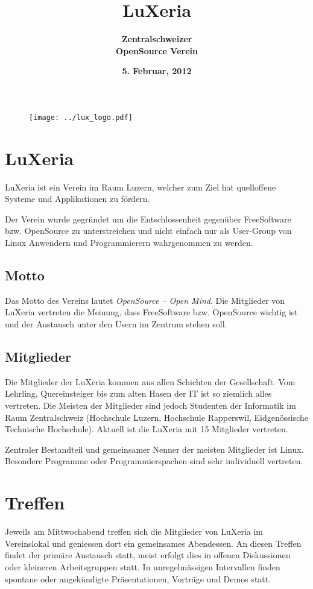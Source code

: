 \documentclass[10pt,foldmark,notumble]{leaflet}
\title{\bf LuXeria}
\author{%
\Large \bf Zentralschweizer\\\bf OpenSource Verein
}
\date{\bf 5. Februar, 2012 }
\begin{document}
\clearpage
\thispagestyle{empty}
\maketitle

\vfill
\begin{figure}
\centering
\texttt{[image: ../lux\_logo.pdf]}
\end{figure}


\newpage
\section{LuXeria}
LuXeria ist ein Verein im Raum Luzern, welcher zum Ziel hat 
quelloffene Systeme und Applikationen zu fördern.


Der Verein wurde gegründet um die Entschlossenheit gegenüber
FreeSoftware bzw. OpenSource zu unterstreichen und nicht einfach 
nur als User-Group von Linux Anwendern und Programmierern wahrgenommen
zu werden.

\subsection{Motto}
Das Motto des Vereins lautet \emph{OpenSource -- Open Mind}.
Die Mitglieder von LuXeria vertreten die Meinung, dass 
FreeSoftware bzw. OpenSource wichtig ist und der Austausch 
unter den Usern im Zentrum stehen soll. 

\subsection{Mitglieder}
Die Mitglieder der LuXeria kommen aus allen Schichten der Gesellschaft.
Vom Lehrling, Quereinsteiger bis zum alten Hasen der IT ist so ziemlich 
alles vertreten. Die Meisten der Mitglieder sind jedoch Studenten der 
Informatik im Raum Zentralschweiz (Hochschule Luzern, Hochschule 
Rapperswil, Eidgenössische Technische Hochschule). 
Aktuell ist die LuXeria mit 15 Mitglieder vertreten.

Zentraler Bestandteil und gemeinsamer Nenner der meisten 
Mitglieder ist Linux. Besondere Programme oder Programmierspachen 
sind sehr individuell vertreten.

\section{Treffen}
Jeweils am Mittwochabend treffen sich die Mitglieder von LuXeria 
im Vereinslokal und geniessen dort ein gemeinsames Abendessen.
An diesen Treffen findet der primäre Austausch statt, meist 
erfolgt dies in offenen Diskussionen oder kleineren Arbeitsgruppen
statt. In unregelmässigen Intervallen finden spontane oder
angekündigte Präsentationen, Vorträge und Demos statt.
\end{document}
